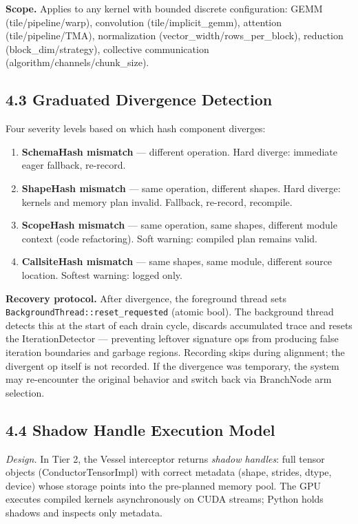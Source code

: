 \textbf{Scope.} Applies to any kernel with bounded discrete configuration: GEMM (tile/pipeline/warp), convolution (tile/implicit\_gemm), attention (tile/pipeline/TMA), normalization (vector\_width/rows\_per\_block), reduction (block\_dim/strategy), collective communication (algorithm/channels/chunk\_size).

\subsection{4.3 Graduated Divergence Detection}\label{graduated-divergence-detection}

Four severity levels based on which hash component diverges:

\begin{enumerate}
\def\labelenumi{\arabic{enumi}.}
\tightlist
\item
  \textbf{SchemaHash mismatch} --- different operation. Hard diverge: immediate eager fallback, re-record.
\item
  \textbf{ShapeHash mismatch} --- same operation, different shapes. Hard diverge: kernels and memory plan invalid. Fallback, re-record, recompile.
\item
  \textbf{ScopeHash mismatch} --- same operation, same shapes, different module context (code refactoring). Soft warning: compiled plan remains valid.
\item
  \textbf{CallsiteHash mismatch} --- same shapes, same module, different source location. Softest warning: logged only.
\end{enumerate}

\textbf{Recovery protocol.} After divergence, the foreground thread sets \texttt{BackgroundThread::reset\_requested} (atomic bool). The background thread detects this at the start of each drain cycle, discards accumulated trace and resets the IterationDetector --- preventing leftover signature ops from producing false iteration boundaries and garbage regions. Recording skips during alignment; the divergent op itself is not recorded. If the divergence was temporary, the system may re-encounter the original behavior and switch back via BranchNode arm selection.

\subsection{4.4 Shadow Handle Execution Model}\label{shadow-handle-execution-model}

\emph{Design.} In Tier 2, the Vessel interceptor returns \emph{shadow handles}: full tensor objects (ConductorTensorImpl) with correct metadata (shape, strides, dtype, device) whose storage points into the pre-planned memory pool. The GPU executes compiled kernels asynchronously on CUDA streams; Python holds shadows and inspects only metadata.

